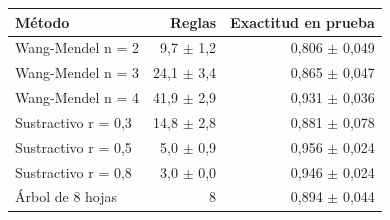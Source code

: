 \begin{tabular}{lrr}
\toprule
Método & Reglas & Exactitud en prueba \\
\midrule
Wang-Mendel n = 2 & 9,7 $\pm$ 1,2 & 0,806 $\pm$ 0,049 \\
Wang-Mendel n = 3 & 24,1 $\pm$ 3,4 & 0,865 $\pm$ 0,047 \\
Wang-Mendel n = 4 & 41,9 $\pm$ 2,9 & 0,931 $\pm$ 0,036 \\
Sustractivo r = 0,3 & 14,8 $\pm$ 2,8 & 0,881 $\pm$ 0,078 \\
Sustractivo r = 0,5 & 5,0 $\pm$ 0,9 & 0,956 $\pm$ 0,024 \\
Sustractivo r = 0,8 & 3,0 $\pm$ 0,0 & 0,946 $\pm$ 0,024 \\
Árbol de 8 hojas & 8 & 0,894 $\pm$ 0,044 \\
\bottomrule
\end{tabular}
